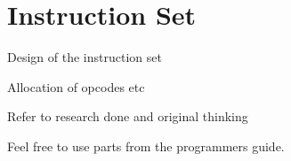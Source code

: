 
\chapter{Instruction Set}
Design of the instruction set

Allocation of opcodes etc

Refer to research done and original thinking

Feel free to use parts from the programmers guide.

